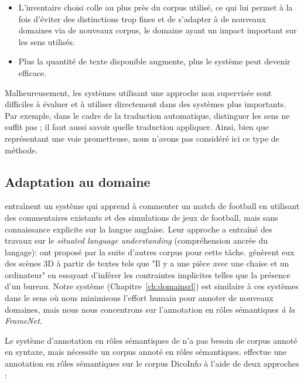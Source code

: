 \begin{itemize}

    \item L'inventaire choisi colle au plus près du corpus utilisé, ce qui lui
        permet à la fois d'éviter des distinctions trop fines et de s'adapter à
        de nouveaux domaines via de nouveaux corpus, le domaine ayant un impact
        important sur les sens utilisés.

    \item Plus la quantité de texte disponible augmente, plus le système peut
        devenir efficace.

\end{itemize}

Malheureusement, les systèmes utilisant une approche non supervisée sont
difficiles à évaluer et à utiliser directement dans des systèmes plus
importants. Par exemple, dans le cadre de la traduction automatique, distinguer
les sens ne suffit pas ; il faut aussi savoir quelle traduction appliquer.
Ainsi, bien que représentant une voie prometteuse, nous n'avons pas considéré
ici ce type de méthode.

\subsection{Adaptation au domaine}

\cite{chen2008learning} entraînent un système qui apprend à commenter un match
de football en utilisant des commentaires existants et des simulations de jeux
de football, mais sans connaissance explicite sur la langue anglaise.  Leur
approche a entraîné des travaux sur le \textit{situated language understanding}
(compréhension ancrée du langage):
\cite{bordes2010towards,richardson2012towards} ont proposé par la suite
d'autres corpus pour cette tâche. \cite{chang2014learning} génèrent eux des
scènes 3D à partir de textes tels que "Il y a une pièce avec une chaise et un
ordinateur" en essayant d'inférer les contraintes implicites telles que la
présence d'un bureau. Notre système (Chapitre~\ref{ch:domainsrl}) est similaire
à ces systèmes dans le sens où nous minimisons l'effort humain pour annoter de
nouveaux domaines, mais nous nous concentrons sur l'annotation en rôles
sémantiques \textit{à la FrameNet}.

Le système d'annotation en rôles sémantiques de \cite{gormley2014low} n'a pas
besoin de corpus annoté en syntaxe, mais nécessite un corpus annoté en rôles
sémantiques. \cite{hadouche2011annotation} effectue une annotation en rôles
sémantiques sur le corpus DicoInfo \citep{corpusolst} à l'aide de deux
approches :

